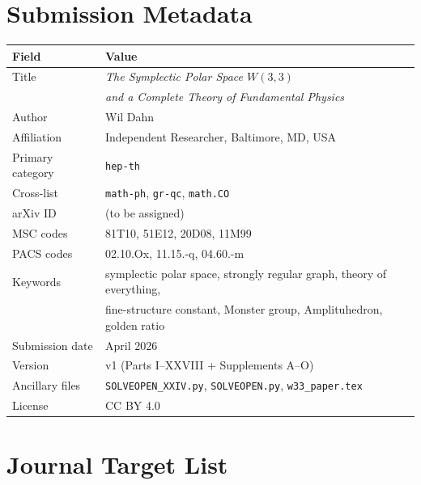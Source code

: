 \section{Submission Metadata}
\label{sec:metadata}

\begin{center}
\begin{tabular}{ll}
  \hline
  Field & Value \\
  \hline
  Title & \emph{The Symplectic Polar Space $W(3,3)$} \\
        & \emph{and a Complete Theory of Fundamental Physics} \\
  Author & Wil Dahn \\
  Affiliation & Independent Researcher, Baltimore, MD, USA \\
  Primary category & \texttt{hep-th} \\
  Cross-list & \texttt{math-ph}, \texttt{gr-qc}, \texttt{math.CO} \\
  arXiv ID & (to be assigned) \\
  MSC codes & 81T10, 51E12, 20D08, 11M99 \\
  PACS codes & 02.10.Ox, 11.15.-q, 04.60.-m \\
  Keywords & symplectic polar space, strongly regular graph,
             theory of everything, \\
           & fine-structure constant, Monster group, Amplituhedron,
             golden ratio \\
  Submission date & April 2026 \\
  Version & v1 (Parts I--XXVIII + Supplements A--O) \\
  Ancillary files & \texttt{SOLVEOPEN\_XXIV.py},
                    \texttt{SOLVEOPEN.py},
                    \texttt{w33\_paper.tex} \\
  License & CC BY 4.0 \\
  \hline
\end{tabular}
\end{center}

\section{Journal Target List}
\label{sec:journals}

